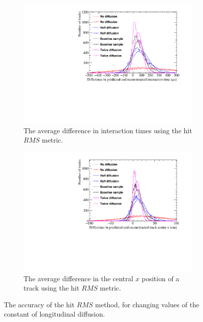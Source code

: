 \begin{figure}[h!]
  \centering
  \begin{subfigure}{0.6\textwidth}
    \centering
    \includegraphics[width=\textwidth]{Canvas_AvDiff_T_RMS_Diffusion}
    \caption{The average difference in interaction times using the hit $RMS$ metric.}
    \label{fig:DiffLDiff_AvDiffRMS_T}
  \end{subfigure}
  \begin{subfigure}{0.6\textwidth}
    \centering
    \includegraphics[width=\textwidth]{Canvas_AvDiff_X_RMS_Diffusion}
    \caption{The average difference in the central $x$ position of a track using the hit $RMS$ metric.}
    \label{fig:DiffLDiff_AvDiffRMS_X}
  \end{subfigure}
  \caption[Comparing the accuracy of the hit $RMS$ method, as the constant of longitudinal diffusion changes]
          {The accuracy of the hit $RMS$ method, for changing values of the constant of longitudinal diffusion. }
  \label{fig:DiffLDiff_AvDiff_RMS}
\end{figure}


